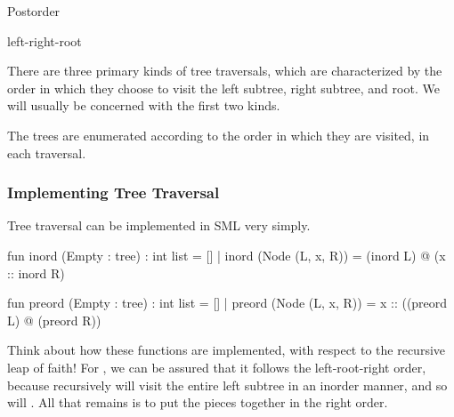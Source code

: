 \documentclass[aspectratio=169, handout]{beamer}
\begin{document}
\begin{frame}[fragile]
\begin{minipage}{0.32\textwidth}
\begin{center}
        \vspace{5pt}

        Postorder

        \vspace{5pt}

        {\color{black!10!red}left}-{\color{black!10!blue}right}-{\color{black!20!green}root}
    \end{center}
  \end{minipage}

  \vspace{\fill}

  There are three primary kinds of tree traversals, which are characterized by the
  order in which they choose to visit the left subtree, right subtree, and root.
  We will usually be concerned with the first two kinds.

  \vspace{\fill}

  The trees are enumerated according to the order in which they are visited, in
  each traversal.
\end{frame}

\begin{frame}[fragile]
  \frametitle{Implementing Tree Traversal}

  \rprs

  Tree traversal can be implemented in SML very simply.

  \pause
  \begin{codeblock}
    fun inord (Empty : tree) : int list = []
      | inord (Node (L, x, R)) = (inord L) @ (x :: inord R)

    fun preord (Empty : tree) : int list = []
      | preord (Node (L, x, R)) = x :: ((preord L) @ (preord R))
  \end{codeblock}

  \pause
  \vspace{\fill}

  Think about how these functions are implemented, with respect to the
  recursive leap of faith! For , we can be assured that it
  follows the left-root-right order, because recursively 
  will visit the entire left subtree in an inorder manner, and so will
  . All that remains is to put the pieces together in the
  right order.

\end{frame}


\end{document}
